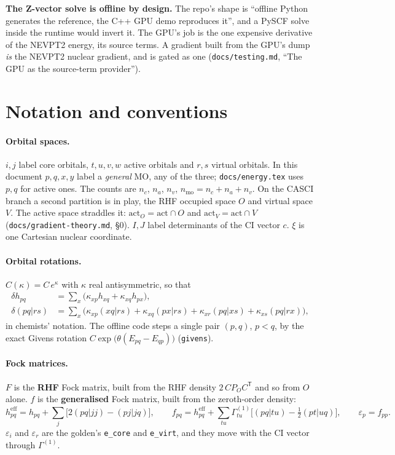 \documentclass[11pt]{article}
\newcommand{\code}[1]{\texttt{#1}}
\newcommand{\G}[1]{\Gamma^{(#1)}}
\newcommand{\eps}{\varepsilon}
\newcommand{\heff}{h^{\mathrm{eff}}}
\begin{document}
\textbf{The Z-vector solve is offline by design.} The repo's shape is
``offline Python generates the reference, the C++ GPU demo reproduces it'',
and a PySCF solve inside the runtime would invert it. The GPU's job is the one
expensive derivative of the NEVPT2 energy, its source terms. A gradient built
from the GPU's dump \emph{is} the NEVPT2 nuclear gradient, and is gated as one
(\code{docs/testing.md}, ``The GPU as the source-term provider'').

\section{Notation and conventions}
\label{sec:notation}

\paragraph{Orbital spaces.} $i,j$ label core orbitals, $t,u,v,w$ active
orbitals and $r,s$ virtual orbitals. In this document $p,q,x,y$ label a
\emph{general} MO, any of the three; \code{docs/energy.tex} uses $p,q$ for
active ones. The counts are $n_c$, $n_a$, $n_v$, $n_{\mathrm{mo}} = n_c + n_a
+ n_v$. On the CASCI branch a second partition is in play, the RHF occupied
space $O$ and virtual space $V$. The active space straddles it:
$\mathrm{act}_O = \mathrm{act}\cap O$ and $\mathrm{act}_V = \mathrm{act}\cap
V$ (\code{docs/gradient-theory.md}, \S0). $I,J$ label determinants of the CI
vector $c$. $\xi$ is one Cartesian nuclear coordinate.

\paragraph{Orbital rotations.} $C(\kappa) = C\,e^{\kappa}$ with $\kappa$ real
antisymmetric, so that
\begin{align}
  \delta h_{pq} &= \sum_x \bigl(\kappa_{xp} h_{xq} + \kappa_{xq} h_{px}\bigr),
  \label{eq:dh}\\
  \delta(pq|rs) &= \sum_x \bigl(\kappa_{xp}(xq|rs) + \kappa_{xq}(px|rs)
     + \kappa_{xr}(pq|xs) + \kappa_{xs}(pq|rx)\bigr),
  \label{eq:dg}
\end{align}
in chemists' notation. The offline code steps a single pair $(p,q)$, $p<q$,
by the exact Givens rotation $C\exp\bigl(\theta(E_{pq}-E_{qp})\bigr)$
(\code{givens}).

\paragraph{Fock matrices.} $F$ is the \textbf{RHF} Fock matrix, built from the
RHF density $2\,C P_O C^{\mathsf T}$ and so from $O$ alone. $f$ is the
\textbf{generalised} Fock matrix, built from the zeroth-order density:
\begin{equation}
  \heff_{pq} = h_{pq} + \sum_j \bigl[2(pq|jj) - (pj|jq)\bigr],\qquad
  f_{pq} = \heff_{pq} + \sum_{tu}\G1_{tu}\bigl[(pq|tu) - \tfrac12(pt|uq)\bigr],
  \qquad \eps_p = f_{pp}.
  \label{eq:fock}
\end{equation}
$\eps_i$ and $\eps_r$ are the golden's \code{e\_core} and \code{e\_virt}, and
they move with the CI vector through $\G1$.
\end{document}
